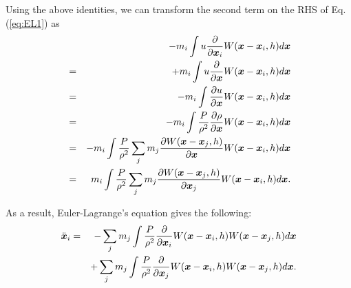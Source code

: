 \documentclass{cjour}
\newcommand{ \Vec   }[1]{ \mbox{\boldmath $ #1 $} }
\newcommand{ \PD    }[2]{ \frac{ \partial #1 }{ \partial #2 } }
\begin{document}
\begin{article}
Using the above identities, we can transform the second term 
on the RHS of Eq. (\ref{eq:EL1}) as  
 \begin{eqnarray}
       &   &  -          m_i 
                         \int u \PD{}{\Vec{x}_i} 
                         W(\Vec{x}-\Vec{x}_i, h) d\Vec{x} \nonumber \\
       & = &  +          m_i 
                         \int u \PD{}{\Vec{x} } 
                         W(\Vec{x}-\Vec{x}_i, h) d\Vec{x} \nonumber \\
       & = &  -          m_i 
                         \int \PD{ u }{ \Vec{x} } 
                         W( \Vec{x}-\Vec{x}_i, h ) d\Vec{x} \nonumber \\
       & = &  -          m_i 
                         \int \frac{ P }{ \rho^2 }
                         \PD{ \rho }{ \Vec{x} }
                         W( \Vec{x}-\Vec{x}_i, h ) d\Vec{x} \nonumber \\
       & = &  -          m_i 
                         \int \frac{ P }{ \rho^2 }
                         \sum_{j} m_j
                         \PD{ W( \Vec{x}-\Vec{x}_j, h ) }{ \Vec{x} }
                         W( \Vec{x}-\Vec{x}_i, h ) d\Vec{x} \nonumber \\
       & = &             m_i 
                         \int \frac{ P }{ \rho^2 }
                         \sum_{j} m_j
                         \PD{ W( \Vec{x}-\Vec{x}_j, h ) }{ \Vec{x}_j }
                         W( \Vec{x}-\Vec{x}_i, h ) d\Vec{x}  .
 \end{eqnarray}

As a result, Euler-Lagrange's equation gives the following: 
 \begin{eqnarray}
                \ddot{\Vec{x}}_i
       & = &  - \sum_{j} m_j 
                         \int \frac{ P }{ \rho^2 }
                         \PD{}{\Vec{x}_i}
                         W(\Vec{x}-\Vec{x}_i, h)
                         W(\Vec{x}-\Vec{x}_j, h) d\Vec{x} \nonumber \\
       &   &  + \sum_{j} m_j 
                         \int \frac{ P }{ \rho^2 }
                         \PD{}{\Vec{x}_j}
                         W(\Vec{x}-\Vec{x}_i, h)
                         W(\Vec{x}-\Vec{x}_j, h) d\Vec{x} .
 \end{eqnarray}





\end{article}
\end{document}
